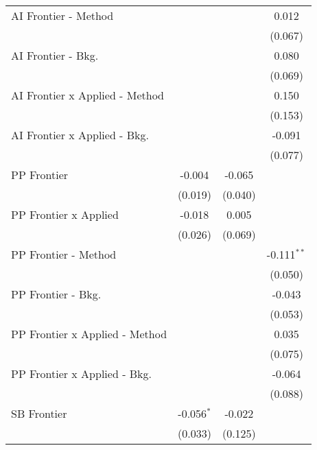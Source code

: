 \begin{tabular}{lccc}
   AI Frontier - Method           &              &               & 0.012\\   
                                  &              &               & (0.067)\\   
   AI Frontier - Bkg.             &              &               & 0.080\\   
                                  &              &               & (0.069)\\   
   AI Frontier x Applied - Method &              &               & 0.150\\   
                                  &              &               & (0.153)\\   
   AI Frontier x Applied - Bkg.   &              &               & -0.091\\   
                                  &              &               & (0.077)\\   
   PP Frontier                    & -0.004       & -0.065        &   \\   
                                  & (0.019)      & (0.040)       &   \\   
   PP Frontier x Applied          & -0.018       & 0.005         &   \\   
                                  & (0.026)      & (0.069)       &   \\   
   PP Frontier - Method           &              &               & -0.111$^{**}$\\   
                                  &              &               & (0.050)\\   
   PP Frontier - Bkg.             &              &               & -0.043\\   
                                  &              &               & (0.053)\\   
   PP Frontier x Applied - Method &              &               & 0.035\\   
                                  &              &               & (0.075)\\   
   PP Frontier x Applied - Bkg.   &              &               & -0.064\\   
                                  &              &               & (0.088)\\   
   SB Frontier                    & -0.056$^{*}$ & -0.022        &   \\   
                                  & (0.033)      & (0.125)       &   \\   

\end{tabular}
